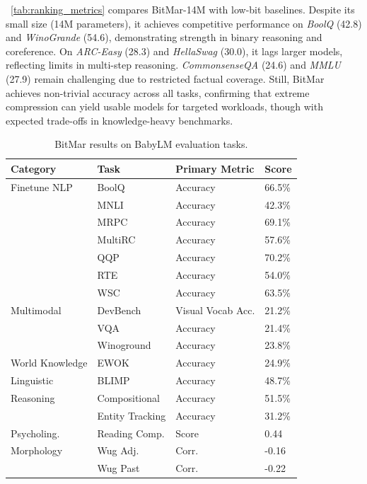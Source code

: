 ~\autoref{tab:ranking_metrics} compares BitMar-14M with low-bit baselines. Despite its small size (14M parameters), it achieves competitive performance on \textit{BoolQ} (42.8) and \textit{WinoGrande} (54.6), demonstrating strength in binary reasoning and coreference. On \textit{ARC-Easy} (28.3) and \textit{HellaSwag} (30.0), it lags larger models, reflecting limits in multi-step reasoning. \textit{CommonsenseQA} (24.6) and \textit{MMLU} (27.9) remain challenging due to restricted factual coverage. Still, BitMar achieves non-trivial accuracy across all tasks, confirming that extreme compression can yield usable models for targeted workloads, though with expected trade-offs in knowledge-heavy benchmarks.

\begin{table}[t]
\centering
\small
\begin{tabular}{l l l l}
\hline
\textbf{Category} & \textbf{Task} & \textbf{Primary Metric} & \textbf{Score} \\
\hline
Finetune NLP & BoolQ & Accuracy & 66.5\% \\
             & MNLI & Accuracy & 42.3\% \\
             & MRPC & Accuracy & 69.1\% \\
             & MultiRC & Accuracy & 57.6\% \\
             & QQP & Accuracy & 70.2\% \\
             & RTE & Accuracy & 54.0\% \\
             & WSC & Accuracy & 63.5\% \\
Multimodal   & DevBench & Visual Vocab Acc. & 21.2\% \\
             & VQA & Accuracy & 21.4\% \\
             & Winoground & Accuracy & 23.8\% \\
World Knowledge & EWOK & Accuracy & 24.9\% \\
Linguistic   & BLIMP & Accuracy & 48.7\% \\
Reasoning    & Compositional & Accuracy & 51.5\% \\
             & Entity Tracking & Accuracy & 31.2\% \\
Psycholing.  & Reading Comp. & Score & 0.44 \\
Morphology   & Wug Adj. & Corr. & -0.16 \\
             & Wug Past & Corr. & -0.22 \\
\hline
\end{tabular}
\caption{BitMar results on BabyLM evaluation tasks.}
\label{tab:bitmar_babylm_results}
\end{table}


